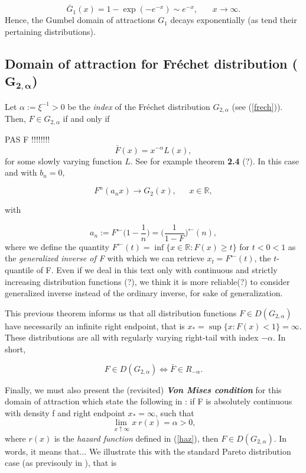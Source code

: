 \documentclass[11pt,a4paper,openany ]{book}
\begin{document}
\begin{equation*}
\bar{G}_1(x)=1-\exp(-e^{-x})\sim e^{-x}, \ \ \ \ \ \ \ \ x\to\infty.
\end{equation*}
Hence, the Gumbel domain of attractions $G_1$ decays exponentially (as tend their pertaining distributions).

\subsection*{Domain of attraction for Fréchet distribution ($\mathbf{G_{2,\alpha}}
	$)}
Let $\alpha:=\xi^{-1}>0$ be the \emph{index} of the Fréchet distribution $G_{2,\alpha}$ (see (\ref{frech})). Then, $F \in G_{2,\alpha}$ if and only if 

PAS F !!!!!!!!
\begin{equation}
\bar{F}(x)=x^{-\alpha} L(x),
\end{equation}
for some slowly varying function $L$. See for example theorem \textbf{2.4} (?). In this case and with $b_n=0$,

\begin{equation*}
F^n(a_nx)\to G_2(x), \ \ \ \ \ \ \  x\in\mathbb{R},
\end{equation*}

with

\begin{equation*}
a_n:=F^{\leftarrow}\big(1-\frac{1}{n}\big)=\Big(\frac{1}{1-F}\Big)^{\leftarrow}(n),
\end{equation*}
where we define the quantity $F^{\leftarrow}(t)=\inf\{x\in\mathbb{R}:F(x)\geq t\}$ for $t<0<1$ as the \emph{generalized inverse of F} with which we can retrieve $x_t=F^{\leftarrow}(t)$, the $t$-quantile of F. Even if we deal in this text only with continuous and strictly increasing distribution functions (?), we think it is more reliable(?) to consider generalized inverse instead of the ordinary inverse, for sake of generalization.

This previous theorem informs us that all distribution functions $F\in D(G_{2,\alpha})$ have necessarily an infinite right endpoint, that is $x_*=\sup\{x:F(x)<1\}=\infty$. These distributions are all with regularly varying right-tail with index $-\alpha$. In short,

\begin{equation*}
F\in D(G_{2,\alpha})\Longleftrightarrow \bar{F}\in R_{-\alpha}.
\end{equation*}


Finally, we must also present the (revisited) \emph{\textbf{Von Mises condition}} for this domain of attraction which state the following in \cite{falk_von_1993} : if F is absolutely continuous with density f and right endpoint $x_*=\infty$, such that 
\begin{equation*}
\displaystyle{\lim_{ \ x \uparrow \infty}} x \ r(x)=\alpha>0,
\end{equation*}
where $r(x)$ is the \emph{hazard function} defined in (\ref{haz}),
then $F\in D(G_{2,\alpha})$. In words, it means that...
We illustrate this with the standard Pareto distribution case (as previsouly in ), that is 
\end{document}
